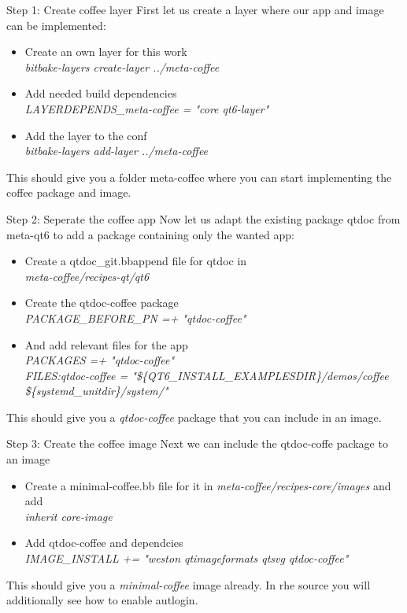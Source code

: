 \documentclass{beamer}
\begin{document}
\begin{frame}{Step 1: Create coffee layer}
	First let us create a layer where our app and image can be implemented:
	\begin{itemize}
		\item Create an own layer for this work\\
			\emph{bitbake-layers create-layer ../meta-coffee}
		\item Add needed build dependencies\\
			\emph{LAYERDEPENDS\_meta-coffee = "core qt6-layer"}
		\item Add the layer to the conf\\
			\emph{bitbake-layers add-layer ../meta-coffee}
	\end{itemize}
	This should give you a folder meta-coffee where you can start implementing
	the coffee package and image.
\end{frame}

\begin{frame}{Step 2: Seperate the coffee app}
	Now let us adapt the existing package qtdoc from meta-qt6 to add a package
	containing only the wanted app:
	\begin{itemize}
		\item Create a qtdoc\_git.bbappend file for qtdoc in\\
			\emph{meta-coffee/recipes-qt/qt6}
		\item Create the qtdoc-coffee package\\
			\emph{PACKAGE\_BEFORE\_PN =+ "qtdoc-coffee"}	
		\item And add relevant files for the app\\
			\emph{PACKAGES =+ "qtdoc-coffee" \\
				  FILES:qtdoc-coffee = "\$\{QT6\_INSTALL\_EXAMPLESDIR\}/demos/coffee \$\{systemd\_unitdir\}/system/"}
	\end{itemize}
	This should give you a \emph{qtdoc-coffee} package that you can include in an image.
\end{frame}


\begin{frame}{Step 3: Create the coffee image}
	Next we can include the qtdoc-coffe package to an image
	\begin{itemize}
		\item Create a minimal-coffee.bb file for it in \emph{meta-coffee/recipes-core/images} and add\\
			\emph{inherit core-image}
		\item Add qtdoc-coffee and dependcies\\
			\emph{IMAGE\_INSTALL += "weston qtimageformats qtsvg qtdoc-coffee"}	
	\end{itemize}
	This should give you a \emph{minimal-coffee} image already. In rhe source you will additionally
	see how to enable autlogin.
\end{frame}
\end{document}
